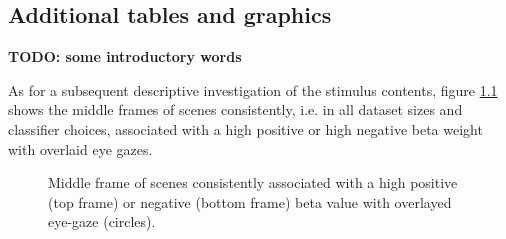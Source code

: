 \documentclass[a4paper, 12pt]{scrreprt}
\begin{document}
\begin{appendices}
	
\chapter{Additional tables and graphics}\label{A:addons}
\textbf{TODO: some introductory words}

As for a subsequent descriptive investigation of the stimulus contents, figure \ref{fig:scenes} shows the middle frames of scenes consistently, i.e. in all dataset sizes and classifier choices, associated with a high positive or high negative beta weight with overlaid eye gazes.

\begin{figure}[H]
	\caption[Descriptive analysis of diagnostic scenes]{\small{Middle frame of scenes consistently associated with a high positive (top frame) or negative (bottom frame) beta value with overlayed eye-gaze (circles).}}
	\label{fig:scenes}
\end{figure}
	

\end{appendices}
\end{document}

